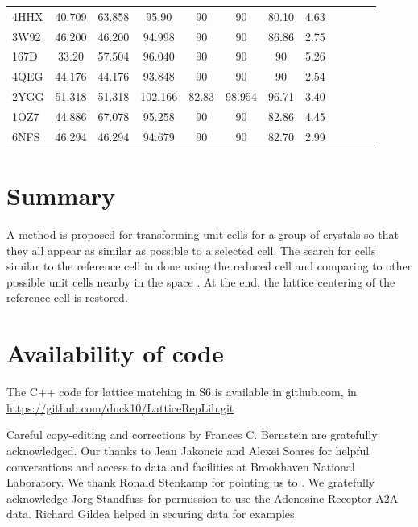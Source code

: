 \documentclass[preprint]{iucr}              %
\numberwithin{equation}{section}
\numberwithin{equation}{section}
\begin{document}
\begin{table}
\begin{center}
\begin{tabular}{lccccccccccc}
4HHX & 40.709 & 63.858 & 95.90 & 90 & 90 & 80.10 & 4.63 \\
3W92 & 46.200 & 46.200 & 94.998 & 90 & 90 & 86.86 & 2.75 \\
167D & 33.20 & 57.504 & 96.040 & 90 & 90 & 90 & 5.26 \\
4QEG & 44.176 & 44.176 & 93.848 & 90 & 90 & 90 & 2.54 \\
2YGG & 51.318 & 51.318 & 102.166 & 82.83 & 98.954 & 96.71 & 3.40  \\
1OZ7 & 44.886 & 67.078 & 95.258 & 90 & 90 & 82.86 & 4.45 \\
6NFS & 46.294 & 46.294 & 94.679 & 90 & 90 & 82.70 & 2.99 \\
				\bottomrule
			\end{tabular}
			\label{tablePDB2}
		\end{center}
	\end{table}	
	
	
	
	\section{Summary}
	
	A method is proposed for transforming unit cells for a group of crystals so that they all appear
	as similar as possible to a selected cell. The search for
	cells similar to the reference cell
	 in done using the reduced cell and comparing to 
	other possible unit cells nearby in the space \SVI{}. 
	At the end, the lattice centering of the reference cell
	is restored.
	
	\section{Availability of code}
	
	The C++ code for lattice matching in S6 is available in github.com, in\\
	\url{https://github.com/duck10/LatticeRepLib.git}
	
	
	
	
	Careful copy-editing and corrections by Frances C. Bernstein are 
	gratefully acknowledged. Our thanks to Jean Jakoncic and Alexei Soares for 
	helpful conversations and access to data and facilities at 
	Brookhaven National Laboratory. We thank Ronald Stenkamp for pointing
	us to . We gratefully acknowledge
	Jörg Standfuss for permission to use the Adenosine Receptor A2A data.
	Richard Gildea helped in securing data for examples.
		
\end{document}

